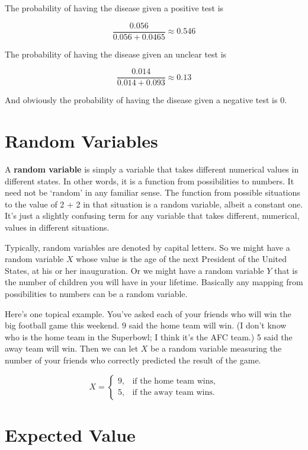 The probability of having the disease given a positive test is

\[
\frac{0.056}{0.056 + 0.0465} \approx 0.546
\]

The probability of having the disease given an unclear test is

\[
\frac{0.014}{0.014 + 0.093} \approx 0.13
\]

And obviously the probability of having the disease given a negative test is 0.

\section{Random Variables}
\label{randomvariables}

A \textbf{random variable} is simply a variable that takes different numerical values in different states. In other words, it is a function from possibilities to numbers. It need not be `random' in any familiar sense. The function from possible situations to the value of 2 + 2 in that situation is a random variable, albeit a constant one. It's just a slightly confusing term for any variable that takes different, numerical, values in different situations.

Typically, random variables are denoted by capital letters. So we might have a random variable $X$ whose value is the age of the next President of the United States, at his or her inauguration. Or we might have a random variable $Y$ that is the number of children you will have in your lifetime. Basically any mapping from possibilities to numbers can be a random variable.

Here's one topical example. You've asked each of your friends who will win the big football game this weekend. 9 said the home team will win. (I don't know who is the home team in the Superbowl; I think it's the AFC team.) 5 said the away team will win. Then we can let $X$ be a random variable measuring the number of your friends who correctly predicted the result of the game.


\begin{equation*}
X = 
	\begin{cases}
		9,& \text{if the home team wins} ,\\ 
		5,& \text{if the away team wins} .
	\end{cases}
\end{equation*}

\newpage
\section{Expected Value}
\label{expectedvalue}


